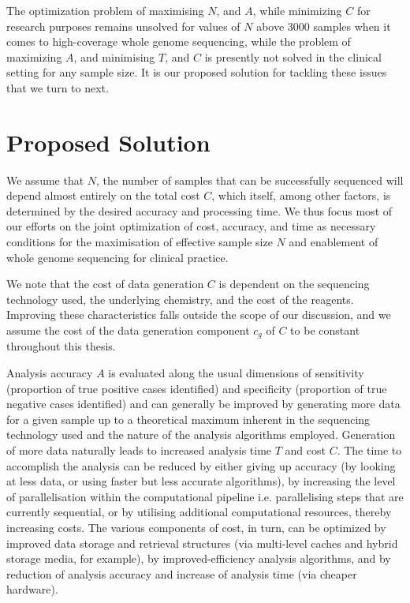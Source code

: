 The optimization problem of maximising $N$, and $A$, while minimizing $C$ for research purposes remains unsolved for values of $N$ above 3000 samples when it comes to high-coverage whole genome sequencing, while the problem of maximizing $A$, and minimising $T$, and $C$ is presently not solved in the clinical setting for any sample size. It is our proposed solution for tackling these issues that we turn to next.

\section{Proposed Solution} 

We assume that $N$, the number of samples that can be successfully sequenced will depend almost entirely on the total cost $C$, which itself, among other factors, is determined by the desired accuracy and processing time. We thus focus most of our efforts on the joint optimization of cost, accuracy, and time as necessary conditions for the maximisation of effective sample size $N$ and enablement of whole genome sequencing for clinical practice. 

We note that the cost of data generation $C$ is dependent on the sequencing technology used, the underlying chemistry, and the cost of the reagents\autocite{mohinudeen2017overview}. Improving these characteristics falls outside the scope of our discussion, and we assume the cost of the data generation component $c_{g}$ of $C$ to be constant throughout this thesis.

Analysis accuracy $A$ is evaluated along the usual dimensions of sensitivity (proportion of true positive cases identified) and specificity (proportion of true negative cases identified) and can generally be improved by generating more data for a given sample up to a theoretical maximum inherent in the sequencing technology used and the nature of the analysis algorithms employed. Generation of more data naturally leads to increased analysis time $T$ and cost $C$. The time to accomplish the analysis can be reduced by either giving up accuracy (by looking at less data, or using faster but less accurate algorithms\autocite{li2010survey}), by increasing the level of parallelisation within the computational pipeline i.e. parallelising steps that are currently sequential\autocite{langmead2012fast}, or by utilising additional computational resources, thereby increasing costs. The various components of cost, in turn, can be optimized by improved data storage and retrieval structures\autocite{papadopoulos2016tiledb} (via multi-level caches and hybrid storage media, for example), by improved-efficiency analysis algorithms, and by reduction of analysis accuracy and increase of analysis time (via cheaper hardware).

